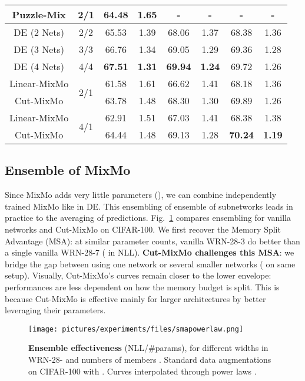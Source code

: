 \documentclass[10pt,twocolumn,letterpaper]{article}
\begin{document}
\begin{table}[!h]
{\begin{tabular}{c | c | c c | c c | c c }
            \midrule
Puzzle-Mix & 2/1 & 64.48 & 1.65 &-&- &- &- \\
\midrule
            DE (2 Nets) & 2/2 & 65.53 & 1.39 & 68.06 & 1.37 & 68.38 & 1.36 \\
            DE (3 Nets) & 3/3 & 66.76 & 1.34 & 69.05 & 1.29 & 69.36 & 1.28 \\
            DE (4 Nets) & 4/4 & \textbf{67.51} & \textbf{1.31} & \textbf{69.94} & \textbf{1.24} & 69.72 & 1.26 \\
            \midrule
            \midrule
            \multirow{1}{*}{Linear-MixMo} & \multirow{2}{*}{2/1} & 61.58 & 1.61 & 66.62 & 1.41 & 68.18 & 1.36 \\
\multirow{1}{*}{Cut-MixMo} & & 63.78 & 1.48 & 68.30 & 1.30 & 69.89 & 1.26 \\
            \midrule
            \multirow{1}{*}{Linear-MixMo} & \multirow{2}{*}{4/1} & 62.91 & 1.51 & 67.03 & 1.41 & 68.38 & 1.38\\
\multirow{1}{*}{Cut-MixMo} & & 64.44 & 1.48 & 69.13 & 1.28 & \textbf{70.24} & \textbf{1.19}\\
            \bottomrule \end{tabular}}
\label{table:tiny200}
\end{table}
 \subsection{Ensemble of MixMo}\label{expe:ensemblemixmo}
Since MixMo adds very little parameters (), we can combine independently trained MixMo like in DE. This ensembling of ensemble of subnetworks leads in practice to the
averaging of  predictions.
Fig.~\ref{fig:splitadvantage} compares ensembling for vanilla networks
and Cut-MixMo on CIFAR-100. We first recover the Memory Split Advantage
\cite{chirkova2020deep,lobacheva2020power,wang2020ultiple,zhao2020plitnet} (MSA): at similar parameter counts,  vanilla
WRN-28-3 do better than a single vanilla WRN-28-7 ( in NLL). \textbf{Cut-MixMo challenges this MSA}: we bridge the gap between using one network or several smaller networks ( on same setup). 
Visually, Cut-MixMo's curves remain closer to the lower envelope: performances are less dependent on how the memory budget is split.
This is because Cut-MixMo is effective mainly for larger architectures by better leveraging their parameters.\begin{figure}[!t]\centering \texttt{[image: pictures/experiments/files/smapowerlaw.png]}\caption{\textbf{Ensemble effectiveness} (NLL/\#params), for different widths  in WRN-28- and numbers of members . Standard data augmentations on CIFAR-100 with . Curves interpolated through power laws \cite{lobacheva2020power}.}\label{fig:splitadvantage}\end{figure}%
\end{document}
